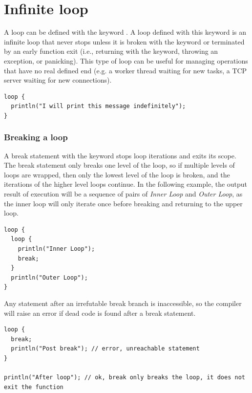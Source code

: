 \section{Infinite loop}%
\label{sec:flow:inf_loop}

A loop can be defined with the keyword . A loop defined with this
keyword is an infinite loop that never stops unless it is broken with the
 keyword or terminated by an early function exit (i.e., returning
with the  keyword, throwing an exception, or panicking). This type
of loop can be useful for managing operations that have no real defined end
(e.g. a worker thread waiting for new tasks, a TCP server waiting for new
connections).

\begin{lstlisting}[style=coloredverbatim, escapechar=@]
loop {
  println("I will print this message indefinitely");
}
\end{lstlisting}

\subsubsection{Breaking a loop}
\label{sec:flow:breaking_loops}

A break statement with the keyword  stops loop iterations and exits
its scope. The break statement only breaks one level of the loop, so if multiple
levels of loops are wrapped, then only the lowest level of the loop is broken,
and the iterations of the higher level loops continue. In the following example,
the output result of execution will be a sequence of pairs of \textit{Inner
  Loop} and \textit{Outer Loop}, as the inner loop will only iterate once before
breaking and returning to the upper loop.

\begin{lstlisting}[style=coloredverbatim, escapechar=@]
loop {
  loop {
    println("Inner Loop");
    break;
  }
  println("Outer Loop");
}
\end{lstlisting}

Any statement after an irrefutable break branch is inaccessible, so the compiler
will raise an error if dead code is found after a break statement.

\begin{lstlisting}[style=coloredverbatimError, escapechar=@]
loop {
  break;
  println("Post break"); // error, unreachable statement
}

println("After loop"); // ok, break only breaks the loop, it does not exit the function
\end{lstlisting}

